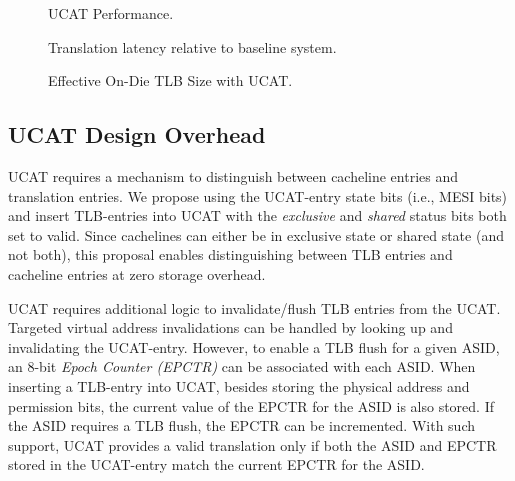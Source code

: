 \begin{figure}[tp] 
  \vspace{-0.in} \centering
  \centerline{}

  \caption{\small UCAT Performance. \normalsize}
  \label{fig:perf_UCAT} 
  \vspace{0.1 in}
\end{figure}

\begin{figure}[tp] 
  \vspace{0.in} \centering
  \centerline{}

  \caption{\small Translation latency relative to baseline system.\normalsize}
  \label{fig:tlblat_UCAT} 
  \vspace{-0.0 in}
\end{figure}

\begin{figure}[tp] 
  \vspace{0.in} \centering
  \centerline{}

  \caption{\small Effective On-Die TLB Size with UCAT.\normalsize}
  \label{fig:tlbsize_UCAT} 
  \vspace{-0.0 in}
\end{figure}


\subsection{UCAT Design Overhead}

\noindent UCAT requires a mechanism to distinguish between cacheline
entries and translation entries. We propose using the UCAT-entry state
bits (i.e., MESI bits) and insert TLB-entries into UCAT with the {\em
exclusive} and {\em shared} status bits both set to valid. Since
cachelines can either be in exclusive state or shared state (and not
both), this proposal enables distinguishing between TLB entries and
cacheline entries at zero storage overhead.

UCAT requires additional logic to invalidate/flush TLB entries from
the UCAT. Targeted virtual address invalidations can be handled by
looking up and invalidating the UCAT-entry. However, to enable a TLB
flush for a given ASID, an 8-bit {\em Epoch Counter (EPCTR)} can be
associated with each ASID. When inserting a TLB-entry into UCAT,
besides storing the physical address and permission bits, the current
value of the EPCTR for the ASID is also stored. If the ASID requires a
TLB flush, the EPCTR can be incremented. With such support, UCAT
provides a valid translation only if both the ASID and EPCTR stored in
the UCAT-entry match the current EPCTR for the ASID.
